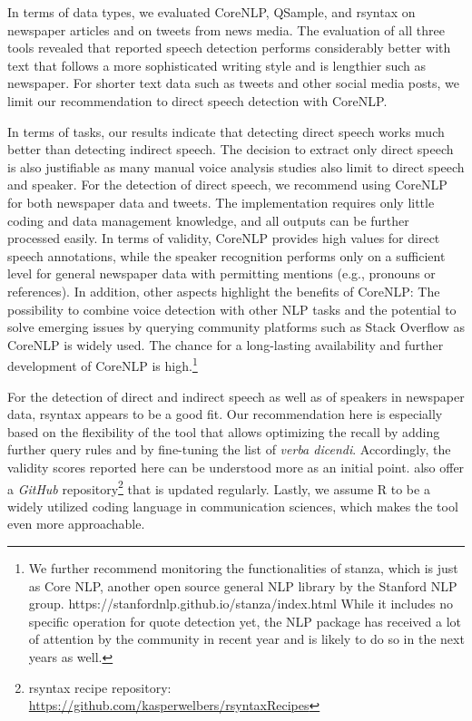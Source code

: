 \documentclass{ccr}
\begin{document}
In terms of data types, we evaluated CoreNLP, QSample, and rsyntax on
newspaper articles and on tweets from news media. The evaluation of all
three tools revealed that reported speech detection performs
considerably better with text that follows a more sophisticated writing
style and is lengthier such as newspaper. For shorter text data such as
tweets and other social media posts, we limit our recommendation to
direct speech detection with CoreNLP.

In terms of tasks, our results indicate that detecting direct speech
works much better than detecting indirect speech. The decision to
extract only direct speech is also justifiable as many manual voice
analysis studies also limit to direct speech and speaker. For the
detection of direct speech, we recommend using CoreNLP for both
newspaper data and tweets. The implementation requires only little
coding and data management knowledge, and all outputs can be further
processed easily. In terms of validity, CoreNLP provides high values for
direct speech annotations, while the speaker recognition performs only on a
sufficient level for general newspaper data with permitting mentions
(e.g., pronouns or references). In addition, other aspects highlight the
benefits of CoreNLP: The possibility to combine voice detection with
other NLP tasks and the potential to solve emerging issues by querying
community platforms such as Stack Overflow as CoreNLP is widely used.
The chance for a long-lasting availability and further development of
CoreNLP is high.\footnote{We further recommend monitoring the functionalities of stanza, which
is just as Core NLP, another open source general NLP library by the Stanford NLP group.
https://stanfordnlp.github.io/stanza/index.html While it includes no
specific operation for quote detection yet, the NLP package has
received a lot of attention by the community in recent year and is
likely to do so in the next years as well.}

For the detection of direct and indirect speech as well as of speakers
in newspaper data, rsyntax appears to be a good fit. Our recommendation
here is especially based on the flexibility of the tool that allows
optimizing the recall by adding further query rules and by fine-tuning
the list of \textit{verba dicendi}. Accordingly, the validity scores
reported here can be understood more as an initial point. \textcite{welbers2021extracting} also offer a \textit{GitHub} repository\footnote{rsyntax recipe repository: \url{https://github.com/kasperwelbers/rsyntaxRecipes}
 } that is updated regularly. Lastly, we assume R to be a
widely utilized coding language in communication sciences, which makes
the tool even more approachable.
\end{document}
